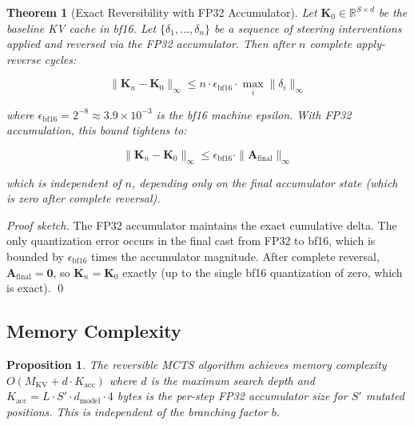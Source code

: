 \documentclass{article}
\newtheorem{theorem}{Theorem}
\newtheorem{proposition}{Proposition}
\begin{document}
\begin{theorem}[Exact Reversibility with FP32 Accumulator]
Let $\mathbf{K}_0 \in \mathbb{R}^{S \times d}$ be the baseline KV cache in bf16. Let $\{\delta_1, \ldots, \delta_n\}$ be a sequence of steering interventions applied and reversed via the FP32 accumulator. Then after $n$ complete apply-reverse cycles:

\begin{equation}
\|\mathbf{K}_n - \mathbf{K}_0\|_\infty \leq n \cdot \epsilon_{\text{bf16}} \cdot \max_i \|\delta_i\|_\infty
\label{eq:reversibility_naive}
\end{equation}

where $\epsilon_{\text{bf16}} = 2^{-8} \approx 3.9 \times 10^{-3}$ is the bf16 machine epsilon. With FP32 accumulation, this bound tightens to:

\begin{equation}
\|\mathbf{K}_n - \mathbf{K}_0\|_\infty \leq \epsilon_{\text{bf16}} \cdot \|\mathbf{A}_{\text{final}}\|_\infty
\label{eq:reversibility_fp32}
\end{equation}

which is independent of $n$, depending only on the final accumulator state (which is zero after complete reversal).
\end{theorem}

\begin{proof}[Proof sketch]
The FP32 accumulator maintains the exact cumulative delta. The only quantization error occurs in the final cast from FP32 to bf16, which is bounded by $\epsilon_{\text{bf16}}$ times the accumulator magnitude. After complete reversal, $\mathbf{A}_{\text{final}} = \mathbf{0}$, so $\mathbf{K}_n = \mathbf{K}_0$ exactly (up to the single bf16 quantization of zero, which is exact). \qed
\end{proof}

\subsection{Memory Complexity}

\begin{proposition}
The reversible MCTS algorithm achieves memory complexity $O(M_{\text{KV}} + d \cdot K_{\text{acc}})$ where $d$ is the maximum search depth and $K_{\text{acc}} = L \cdot S' \cdot d_{\text{model}} \cdot 4$ bytes is the per-step FP32 accumulator size for $S'$ mutated positions. This is independent of the branching factor $b$.
\end{proposition}
\end{document}
